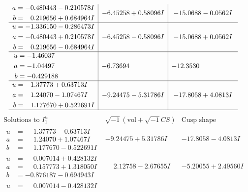 \documentclass[1p]{elsarticle_modified}
\theoremstyle{definition}
\newcommand{\I}{\sqrt{-1}}
\begin{document}
$$\begin{array}{c|c|c}
\begin{aligned}
a &= -0.480443 - 0.210578 I \\
b &= \phantom{-}0.219656 + 0.684964 I\end{aligned}
 & -6.45258 + 0.58096 I & -15.0688 - 0.0562 I \\ \hline\begin{aligned}
u &= -1.336150 - 0.286473 I \\
a &= -0.480443 + 0.210578 I \\
b &= \phantom{-}0.219656 - 0.684964 I\end{aligned}
 & -6.45258 - 0.58096 I & -15.0688 + 0.0562 I \\ \hline\begin{aligned}
u &= -1.46037\phantom{ +0.000000I} \\
a &= -1.04497\phantom{ +0.000000I} \\
b &= -0.429188\phantom{ +0.000000I}\end{aligned}
 & -6.73694\phantom{ +0.000000I} & -12.3530\phantom{ +0.000000I} \\ \hline\begin{aligned}
u &= \phantom{-}1.37773 + 0.63713 I \\
a &= \phantom{-}1.24070 - 1.07467 I \\
b &= \phantom{-}1.177670 + 0.522691 I\end{aligned}
 & -9.24475 - 5.31786 I & -17.8058 + 4.0813 I\\
 \hline 
 \end{array}$$\newpage$$\begin{array}{c|c|c}  
\text{Solutions to }I^u_{1}& \I (\text{vol} + \sqrt{-1}CS) & \text{Cusp shape}\\
 \hline 
\begin{aligned}
u &= \phantom{-}1.37773 - 0.63713 I \\
a &= \phantom{-}1.24070 + 1.07467 I \\
b &= \phantom{-}1.177670 - 0.522691 I\end{aligned}
 & -9.24475 + 5.31786 I & -17.8058 - 4.0813 I \\ \hline\begin{aligned}
u &= \phantom{-}0.007014 + 0.428132 I \\
a &= \phantom{-}0.157773 + 1.318050 I \\
b &= -0.876187 - 0.694943 I\end{aligned}
 & \phantom{-}2.12758 - 2.67655 I & -5.20055 + 2.49560 I \\ \hline\begin{aligned}
u &= \phantom{-}0.007014 - 0.428132 I \\

\end{aligned}
\end{array}$$
\end{document}
